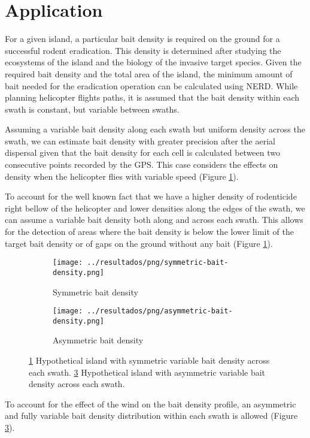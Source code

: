 \section{Application}
For a given island, a particular bait density is required on the ground for a successful rodent eradication. This density is determined after studying the ecosystems of the island and the biology of the invasive target species. Given the required bait density and the total area of the island, the minimum amount of bait needed for the eradication operation can be calculated using NERD. While planning helicopter flights paths, it is assumed that the bait density within each swath is constant, but variable between swaths.

Assuming a variable bait density along each swath but uniform density across the
swath, we can estimate bait density with greater precision after the aerial
dispersal given that the bait density for each cell is calculated between two consecutive points recorded by the GPS. This case considers the effects on
density when the helicopter flies with variable speed (Figure \ref{fig:densidadSimetrica}).

To account for the well known fact that we have a higher density of rodenticide right bellow of the helicopter and lower densities along the edges of the swath, we can assume a variable bait density both along and across each swath.  This allows for the detection of areas where the bait density is below the lower limit of the target bait density or of gaps on the ground without any bait (Figure \ref{fig:densidadSimetrica}).

\begin{figure}
  \centering
  \begin{subfigure}[b]{0.45\textwidth}
    \texttt{[image: ../resultados/png/symmetric-bait-density.png]}
    \caption{
    Symmetric bait density
    }
    \label{fig:densidadSimetrica}
  \end{subfigure}
  \begin{subfigure}[b]{0.45\textwidth}
    \texttt{[image: ../resultados/png/asymmetric-bait-density.png]}
    \caption{
    Asymmetric bait density
    }
    \label{fig:densidadAsimetrica}
  \end{subfigure}
  \caption{
  \ref{fig:densidadSimetrica}
  Hypothetical island with symmetric variable bait density across each swath.
  \ref{fig:densidadAsimetrica}
  Hypothetical island with asymmetric variable bait density across each swath.}
\end{figure}

To account for the effect of the wind on the bait density profile, an asymmetric
and fully variable bait density distribution within each swath is allowed
(Figure \ref{fig:densidadAsimetrica}).
